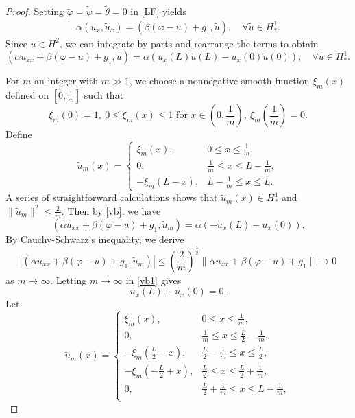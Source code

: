\documentclass[11pt,reqno]{article}
\newcommand{\dt}{\tilde}
\begin{document}
\begin{proof}
	Setting $\dt \varphi = \dt \psi = \dt \theta = 0$ in \eqref{LF} yields
	\begin{align*}
		\alpha(u_x,\dt u_x) = (\beta(\varphi - u) + g_1, \dt u), \quad \forall \dt u \in H_*^1.
	\end{align*}
	Since $u\in H^2$, we can integrate by parts and rearrange the terms to obtain
	\begin{equation}\label{vb}
		(\alpha u_{xx}+\beta(\varphi - u) + g_1,\dt u)=\alpha \left(u_x(L)\dt u(L)-u_x(0)\dt u(0)\right), \quad \forall \dt u \in H_*^1.
	\end{equation}
	
	For $m$ an integer with $m\gg1$, we choose a nonnegative smooth function $\xi_m(x)$ defined on $\left[0,\frac{1}{m}\right]$ such that
	\[
	\xi_m(0)=1, \ 0\le\xi_m(x)\le 1 \text{ for } x\in\left(0,\frac{1}{m}\right), \ \xi_m\left(\frac{1}{m}\right)=0.
	\]
	Define
	\[
	\tilde{u}_m(x)=
	\begin{cases}
		\xi_m(x), & 0\le x\le\frac{1}{m},\\
		0, & \frac{1}{m}\le x\le L-\frac{1}{m},\\
		-\xi_m(L-x), & L-\frac{1}{m}\le x\le L.
	\end{cases}
	\]
	A series of straightforward calculations shows that $\tilde{u}_m(x)\in H_*^1$ and $\|\tilde{u}_m\|^2 \leq \frac{2}{m}$. Then by \eqref{vb}, we have
	\begin{equation}\label{vb1}
		(\alpha u_{xx}+\beta(\varphi - u) + g_1,\tilde{u}_m)=\alpha \left(-u_x(L)-u_x(0)\right).
	\end{equation}
	By Cauchy-Schwarz's inequality, we derive
	\[
	\left| (\alpha u_{xx}+\beta(\varphi - u) + g_1,\tilde{u}_m)\right|\le\left(\frac{2}{m}\right)^{\frac{1}{2}}\|\alpha u_{xx}+\beta(\varphi - u) + g_1\|\to0
	\]
	as $m\to\infty$.
	 Letting $m\to\infty$ in \eqref{vb1} gives
	\begin{equation}\label{vb2}
		u_x(L)+u_x(0)=0.
	\end{equation}
	Let
	\[
	\tilde{u}_m(x)=
	\begin{cases}
		\xi_m(x), & 0\le x\le \frac{1}{m},\\
		0, & \frac{1}{m}\le x\le\frac{L}{2}-\frac{1}{m},\\
		-\xi_m(\frac{L}{2}-x), &
		\frac{L}{2}-\frac{1}{m}\le x\le\frac{L}{2},\\
		-\xi_m(-\frac{L}{2}+x), &
		\frac{L}{2}\le x\le\frac{L}{2}+\frac{1}{m},\\
		0, &
		\frac{L}{2}+\frac{1}{m}\le x\le L-\frac{1}{m},\\

\end{cases}\]
\end{proof}
\end{document}
